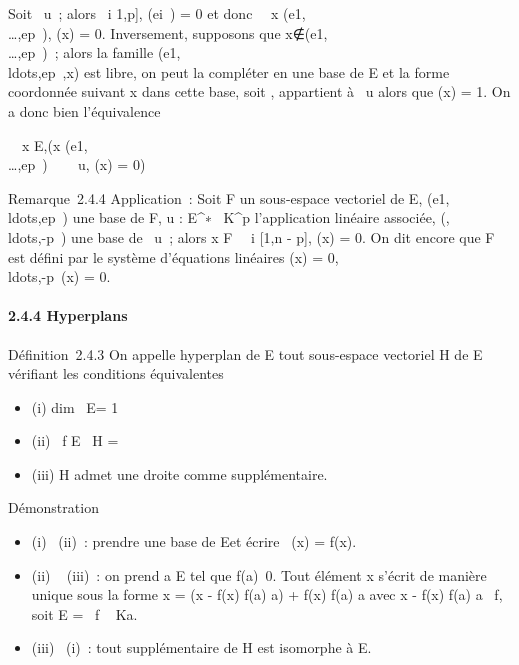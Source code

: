 Soit \phi \in\mathrmKer~u~; alors
\forall~i \in {[}1,p{]}, \phi(ei~) = 0 et donc
\forall~~x
\in\mathrmVect(e1,\\\ldots,ep~),
\phi(x) = 0. Inversement, supposons que
x∉\mathrmVect(e1,\\\ldots,ep~)~;
alors la famille
(e1,\\ldots,ep~,x)
est libre, on peut la compléter en une base de E et la forme coordonnée
suivant x dans cette base, soit \phi, appartient à
\mathrmKer~u alors que \phi(x)
= 1. On a donc bien l'équivalence

\forall~~x \in E,\quad (x
\in\mathrmVect(e1,\\\ldots,ep~)
\Leftrightarrow \forall~~\phi
\in\mathrmKer~u, \phi(x) = 0)

Remarque~2.4.4 Application~: Soit F un sous-espace vectoriel de E,
(e1,\\ldots,ep~)
une base de F, u : E^∗\rightarrow~ K^p l'application linéaire
associée,
(,\\ldots,\phin-p~)
une base de \mathrmKer~u~;
alors x \in F \Leftrightarrow \forall~~i \in
{[}1,n - p{]}, \phii(x) = 0. On dit encore que F est défini par
le système d'équations linéaires (x) =
0,\\ldots,\phin-p~(x)
= 0.

\paragraph{2.4.4 Hyperplans}

Définition~2.4.3 On appelle hyperplan de E tout sous-espace vectoriel H
de E vérifiant les conditions équivalentes

\begin{itemize}
\itemsep1pt\parskip0pt
\item
  (i) dim~ E\diagupH = 1
\item
  (ii) \exists~f \in E
  \diagdown\0\, H =\
  \mathrmKerf
\item
  (iii) H admet une droite comme supplémentaire.
\end{itemize}

Démonstration

\begin{itemize}
\itemsep1pt\parskip0pt
\item
  (i) \rigtharrow~(ii)~: prendre \overlinee une base de E\diagupH et
  écrire \pi~(x) = f(x)\overlinee.
\item
  (ii) \rigtharrow~ (iii)~: on prend a \in E tel que
  f(a)\neq~0. Tout élément x s'écrit de manière
  unique sous la forme x = (x - f(x) \over f(a) a)
  + f(x) \over f(a) a avec x - f(x)
  \over f(a) a
  \in\mathrmKer~f, soit E
  = \mathrmKer~f \oplus~ Ka.
\item
  (iii) \rigtharrow~(i)~: tout supplémentaire de H est isomorphe à E\diagupH.
\end{itemize}

